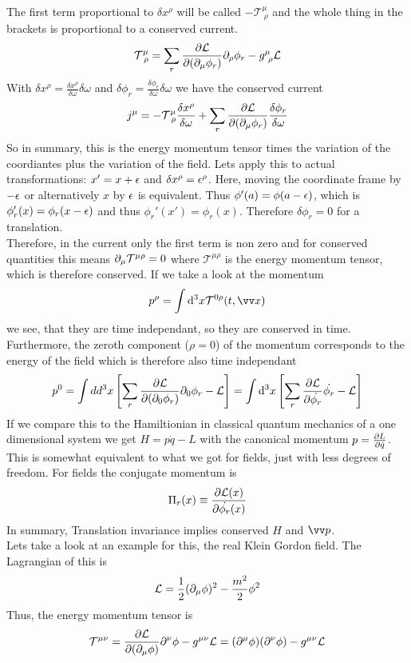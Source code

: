 The first term proportional to $\delta x^\rho$ will be called $- \mathcal{T}^\mu_{~\rho}$ and the whole thing in the brackets is proportional to a conserved current.
\[\mathcal{T}^\mu_{~\rho} = \sum_r \frac{\partial \mathcal{L}}{\partial ( \partial_\mu \phi_r)} \partial_\rho \phi_r - g^\mu_{~\rho} \mathcal{L}\]
With $\delta x^\rho = \frac{\delta x^\rho}{\delta \omega}\delta\omega$ and $\delta \phi_r = \frac{\delta \phi_r}{\delta \omega}{\delta \omega}$ we have the conserved current
\[j ^\mu = - \mathcal{T}^\mu_{~\rho} \frac{\delta x^\rho}{\delta \omega} + \sum_r \frac{\partial \mathcal{L}}{\partial ( \partial_\mu \phi_r)} \frac{\delta \phi_r}{\delta \omega}\]
So in summary, this is the energy momentum tensor times the variation of the coordiantes plus the variation of the field. Lets apply this to actual transformations:
$x' = x + \epsilon$ and $\delta x^\rho = \epsilon ^\rho$. Here, moving the coordinate frame by $- \epsilon$ or alternatively $x$ by $\epsilon$ is equivalent. Thus $ \phi'(a) = \phi(a - \epsilon)$, which is $\phi'_r(x) = \phi_r(x - \epsilon)$ and thus $\phi_r'(x') = \phi_r(x)$. Therefore $\delta \phi_r = 0$ for a translation.\\
Therefore, in the current only the first term is non zero and for conserved quantities this means $\partial_\mu \mathcal{T}^{\mu\rho} = 0$ where $\mathcal{T}^{\mu\rho}$ is the energy momentum tensor, which is therefore conserved. If we take a look at the momentum
\[ p ^\rho = \int \dd^3 x \mathcal{T}^{0\rho}(t, \vx)\]
we see, that they are time independant, so they are conserved in time. Furthermore, the zeroth component ($\rho = 0$) of the momentum corresponds to the energy of the field which is therefore also time independant
\[p^0 = \int dd^3 x \left[ \sum_r \frac{ \partial \mathcal{L}}{\partial ( \partial_0 \phi_r)} \partial_0 \phi_r- \mathcal{L}\right] = \int {\rm d} ^3 x \left[ \sum_r \frac{\partial \mathcal{L}}{\partial \dot{\phi_r}} \dot{\phi_r}-\mathcal{L}\right]\]
If we compare this to the Hamiltionian in classical quantum mechanics of a one dimensional system we get $H = p \dot{q} - L$ with the canonical momentum $p = \frac{\partial L}{\partial \dot{q}}$. This is somewhat equivalent to what we got for fields, just with less degrees of freedom. For fields the conjugate momentum is
\[ \Pi_r(x) \equiv \frac{\partial \mathcal{L}(x)}{\partial \dot{\phi_r}(x)}\]
In summary, Translation invariance implies conserved $H$ and $\vp$.
\\Lets take a look at an example for this, the real Klein Gordon field. The Lagrangian of this is 
\[\mathcal{L} = \frac{1}{2} ( \partial_\mu \phi)^2 - \frac{m^2}{2}\phi^2\]
Thus, the energy momentum tensor is
\[ \mathcal{T}^{\mu\nu} = \frac{\partial\mathcal{L}}{\partial (\partial_\mu \phi)} \partial^\nu \phi - g^{\mu\nu} \mathcal{L} = (\partial ^\mu \phi)(\partial^\nu \phi) - g^{\mu\nu} \mathcal{L}\]
